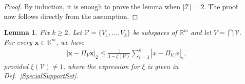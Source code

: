 \documentclass[journal, onecolumn]{IEEEtran}
\newtheorem{lemma}{Lemma}
\begin{document}
\begin{proof}By induction, it is enough to prove the lemma when $|\mathcal{T}| = 2$. The proof now follows directly from the assumption.
\end{proof}


\begin{lemma}\label{DistanceToIntersectionLemma}
Fix $k \geq 2$. Let $\mathcal{V} = \{V_1, \ldots, V_k\}$ be subspaces of $\mathbb{R}^m$ and let $V = \bigcap \mathcal{V}$. For every $\mathbf{x} \in \mathbb{R}^m$, we have
\begin{align}\label{DTILeq}
|\mathbf{x} - \Pi_V \mathbf{x}|_2 \leq \frac{1}{1 - \xi(\mathcal{V})} \sum_{i=1}^k |x - \Pi_{V_i} x|_2,
\end{align}
provided $\xi(\mathcal{V}) \neq 1$, where the expression for $\xi$ is given in Def.~\ref{SpecialSupportSet}.
\end{lemma}
\end{document}
